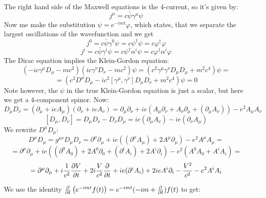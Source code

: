 The right hand side of the Maxwell equations is the 4-current, so it's given
by:
$$j^\mu=c\bar\psi\gamma^\mu\psi$$
Now me make the substitution $\psi=e^{-imt}\varphi$, which states, that we
separate the largest oscillations of the wavefunction and we get
$$j^0=c\bar\psi\gamma^0\psi=c\psi^\dagger\psi=c\varphi^\dagger\varphi$$
$$j^i=c\bar\psi\gamma^i\psi=c\psi^\dagger\alpha^i\psi=c\varphi^\dagger\alpha^i\varphi$$
The Dirac equation implies the Klein-Gordon equation:
$$(-ic\gamma^\mu D_\mu-mc^2)(ic\gamma^\nu D_\nu-mc^2)\psi=
(c^2\gamma^\mu\gamma^\nu D_\mu D_\mu+m^2c^4)\psi=
$$
$$
=(c^2D^\mu D_\mu-ic^2[\gamma^\mu,\gamma^\nu]D_\mu D_\nu+m^2c^4)\psi=0$$
Note however, the $\psi$ in the true Klein-Gordon equation is just a scalar,
but here we get a 4-component spinor. Now:
$$
D_\mu D_\nu = (\partial_\mu+ieA_\mu)(\partial_\nu+ieA_\nu)=
\partial_\mu\partial_\nu+ie(A_\mu\partial_\nu+A_\nu\partial_\mu+
(\partial_\mu A_\nu))-e^2A_\mu A_\nu
$$
$$[D_\mu, D_\nu] = D_\mu D_\nu-D_\nu D_\mu=ie(\partial_\mu A_\nu)-
ie(\partial_\nu A_\mu)$$
We rewrite $D^\mu D_\mu$:
$$D^\mu D_\mu=g^{\mu\nu}D_\mu D_\nu=
\partial^\mu\partial_\mu+ie((\partial^\mu
A_\mu)+2A^\mu\partial_\mu) -e^2A^\mu A_\mu=$$
$$=\partial^\mu\partial_\mu+
ie((\partial^0 A_0)+2A^0\partial_0+(\partial^i A_i)+2A^i\partial_i)
-e^2(A^0A_0+A^i A_i)=$$
$$=\partial^\mu\partial_\mu
+i{1\over c^2}{\partial V\over\partial t}+
2i{V\over c^2}{\partial\over\partial t}
+ie(\partial^i A_i)+2ieA^i\partial_i
 -{V^2\over c^2}-e^2A^iA_i$$

We use the identity
${\partial\over\partial t}\left(e^{-imt}f(t)\right)=
e^{-imt}(-im+{\partial\over\partial t})f(t)$ to get:

